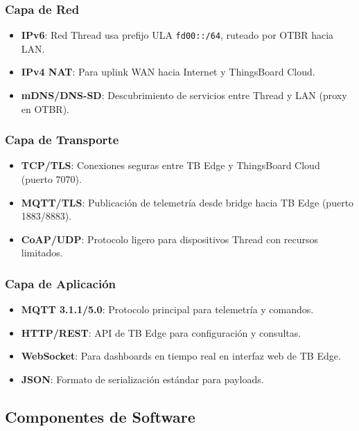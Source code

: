 \subsubsection{Capa de Red}

\begin{itemize}
    \item \textbf{IPv6}: Red Thread usa prefijo ULA \texttt{fd00::/64}, ruteado por OTBR hacia LAN.
    \item \textbf{IPv4 NAT}: Para uplink WAN hacia Internet y ThingsBoard Cloud.
    \item \textbf{mDNS/DNS-SD}: Descubrimiento de servicios entre Thread y LAN (proxy en OTBR).
\end{itemize}

\subsubsection{Capa de Transporte}

\begin{itemize}
    \item \textbf{TCP/TLS}: Conexiones seguras entre TB Edge y ThingsBoard Cloud (puerto 7070).
    \item \textbf{MQTT/TLS}: Publicación de telemetría desde bridge hacia TB Edge (puerto 1883/8883).
    \item \textbf{CoAP/UDP}: Protocolo ligero para dispositivos Thread con recursos limitados.
\end{itemize}

\subsubsection{Capa de Aplicación}

\begin{itemize}
    \item \textbf{MQTT 3.1.1/5.0}: Protocolo principal para telemetría y comandos.
    \item \textbf{HTTP/REST}: API de TB Edge para configuración y consultas.
    \item \textbf{WebSocket}: Para dashboards en tiempo real en interfaz web de TB Edge.
    \item \textbf{JSON}: Formato de serialización estándar para payloads.
\end{itemize}

\subsection{Componentes de Software}

